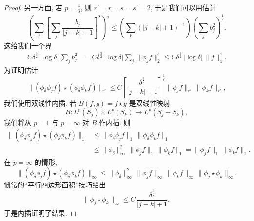 \begin{proof}
另一方面, 若 $p=\frac{4}{3}$, 则 $r'=r=s=s'=2$, 于是我们可以用估计
\[
\left(\sum_{k}\left[\sum_{j}\frac{b_{j}}{|j-k|+1}\right]^{2}\right)^{\frac{1}{2}}
\leq\left(\sum_{k}(|j-k|+1)^{-1}\right)\left(\sum_{j}b_{j}^{2}\right)^{\frac{1}{2}}.
\]
这给我们一个界
\begin{align*}
C\delta^{\frac{3}{2}}\,|\log\delta|\,\sum_{j}b_{j}^{2}
&=C\delta^{\frac{3}{2}}\,|\log\delta|\sum_{j}\|\phi_{j}f\|_{2}^{4}
\leq C\delta^{\frac{3}{2}}\,|\log\delta|\,\|f\|_{4}^{4}.
\end{align*}
为证明估计
\[
\bigl\|(\phi_{\delta}\phi_{j}f)\star(\phi_{\delta}\phi_{k}f)\bigr\|_{r'}
\leq C\left[\frac{\delta^{\frac{3}{2}}}{|j-k|+1}\right]^{\frac{1}{r}}\|\phi_{j}f\|_{r'}\,\|\phi_{k}f\|_{r'},
\]
我们使用双线性内插. 若 $B(f,g)=f\star g$ 是双线性映射
\[
B:L^{p}(S_{j})\times L^{p}(S_{k})\to L^{p}(S_{j}+S_{k}),
\]
我们将从 $p=1$ 与 $p=\infty$ 对 $B$ 作内插. 则
\begin{align*}
\|(\phi_{\delta}\phi_{j}f)\star(\phi_{\delta}\phi_{k}f)\|_{1}
&\leq\|\phi_{\delta}\phi_{j}f\|_{1}\,\|\phi_{\delta}\phi_{k}f\|_{1} \\
&\leq\|\phi_{\delta}\|_{\infty}^{2}\,\|\phi_{j}f\|_{1}\,\|\phi_{k}f\|_{1}
=\|\phi_{j}f\|_{1}\,\|\phi_{k}f\|_{1}.
\end{align*}
在 $p=\infty$ 的情形,
\[
\|(\phi_{\delta}\phi_{j}f)\star(\phi_{\delta}\phi_{k}f)\|_{\infty}
\leq\|\phi_{\delta}\|_{\infty}^{2}\,\|\phi_{j}f\|_{\infty}\,\|\phi_{k}f\|_{\infty}\,\|\phi_{j}\star\phi_{k}\|_{\infty}.
\]
惯常的``平行四边形面积''技巧给出
\[
\|\phi_{j}\star\phi_{k}\|_{\infty}\leq C\,\frac{\delta^{\frac{3}{2}}}{|j-k|+1},
\]
于是内插证明了结果.
\end{proof}

